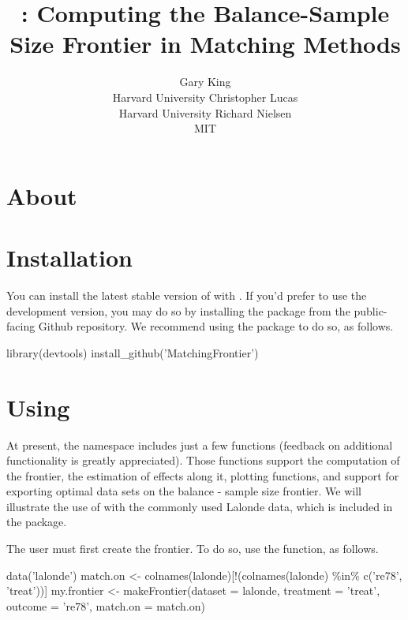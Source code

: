 \documentclass[nojss]{jss}
\author{Gary King\\Harvard University \And 
        Christopher Lucas\\Harvard University \And 
        Richard Nielsen\\MIT}
\title{\pkg{MatchingFrontier}: Computing the Balance-Sample Size Frontier in Matching Methods}
\begin{document}

\section[Introduction]{About }

\section[Usage]{Installation}

You can install the latest stable version of 
with .  If you'd prefer to use the
development version, you may do so by installing the package from the
public-facing Github repository. We recommend using the 
package to do so, as follows.

\begin{Code}
  library(devtools)
  install_github('MatchingFrontier')
\end{Code} 

\section[Usage]{Using }

At present, the  namespace includes just a few
functions (feedback on additional functionality is greatly
appreciated).  Those functions support the computation of the
frontier, the estimation of effects along it, plotting functions, and
support for exporting optimal data sets on the balance - sample size
frontier. We will illustrate the use of  
with the commonly used Lalonde data, which is included in the package.

The user must first create the frontier. To do so, use the 
function, as follows. 

\begin{CodeChunk}
\begin{CodeInput}
  data('lalonde')
  match.on <- colnames(lalonde)[!(colnames(lalonde) \%in\% c('re78', 'treat'))]
  my.frontier <- makeFrontier(dataset = lalonde, 
                              treatment = 'treat', 
                              outcome = 're78', 
                              match.on = match.on)
\end{CodeInput}
\end{CodeChunk}
\end{document}
